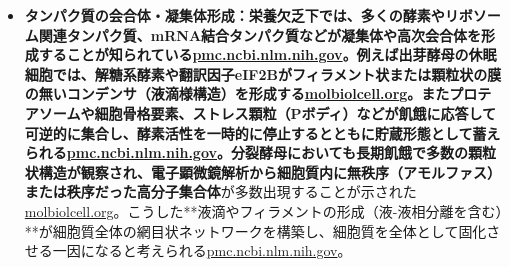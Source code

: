 \begin{itemize}
    \item \textbf{タンパク質の会合体・凝集体形成：\textbf{栄養欠乏下では、多くの酵素やリボソーム関連タンパク質、mRNA結合タンパク質などが凝集体や高次会合体を形成することが知られている\href{https://pmc.ncbi.nlm.nih.gov/articles/PMC6857596/\#:~:text=shown\%20to\%20introduce\%20structural\%20changes,2016}{pmc.ncbi.nlm.nih.gov}。例えば出芽酵母の休眠細胞では、解糖系酵素や翻訳因子eIF2Bがフィラメント状または顆粒状の}膜の無いコンデンサ（液滴様構造）\textbf{を形成する\href{https://www.molbiolcell.org/doi/10.1091/mbc.E20-02-0125\#:~:text=induces\%20a\%20massive\%20reorganization\%20of,a\%20\%E2\%80\%9Csolidification\%E2\%80\%9D\%20of\%20the\%20cytoplasm}{molbiolcell.org}。またプロテアソームや細胞骨格要素、ストレス顆粒（Pボディ）などが飢餓に応答して可逆的に集合し、酵素活性を一時的に停止するとともに貯蔵形態として蓄えられる\href{https://pmc.ncbi.nlm.nih.gov/articles/PMC6857596/\#:~:text=shown\%20to\%20introduce\%20structural\%20changes,2016}{pmc.ncbi.nlm.nih.gov}。分裂酵母においても長期飢餓で多数の顆粒状構造が観察され、電子顕微鏡解析から細胞質内に}無秩序（アモルファス）または秩序だった高分子集合体}が多数出現することが示された\href{https://www.molbiolcell.org/doi/10.1091/mbc.E20-02-0125\#:~:text=induces\%20a\%20massive\%20reorganization\%20of,a\%20\%E2\%80\%9Csolidification\%E2\%80\%9D\%20of\%20the\%20cytoplasm}{molbiolcell.org}。こうした**液滴やフィラメントの形成（液-液相分離を含む）**が細胞質全体の網目状ネットワークを構築し、細胞質を全体として固化させる一因になると考えられる\href{https://pmc.ncbi.nlm.nih.gov/articles/PMC4850707/\#:~:text=match\%20at\%20L1536\%20agreement\%20with,have\%20to\%20determine\%20the\%20molecular}{pmc.ncbi.nlm.nih.gov}。

\end{itemize}
